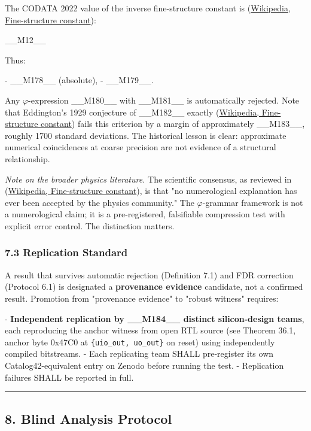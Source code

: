 The CODATA 2022 value of the inverse fine-structure constant is (\href{https://en.wikipedia.org/wiki/Fine-structure\_constant}{Wikipedia, Fine-structure constant}):

\_\_M12\_\_

Thus:

- \_\_M178\_\_ (absolute),
- \_\_M179\_\_.

Any $\varphi$-expression \_\_M180\_\_ with \_\_M181\_\_ is automatically rejected. Note that Eddington's 1929 conjecture of \_\_M182\_\_ exactly (\href{https://en.wikipedia.org/wiki/Fine-structure\_constant}{Wikipedia, Fine-structure constant}) fails this criterion by a margin of approximately \_\_M183\_\_, roughly 1700 standard deviations. The historical lesson is clear: approximate numerical coincidences at coarse precision are not evidence of a structural relationship.

\textit{Note on the broader physics literature.} The scientific consensus, as reviewed in (\href{https://en.wikipedia.org/wiki/Fine-structure\_constant}{Wikipedia, Fine-structure constant}), is that "no numerological explanation has ever been accepted by the physics community." The $\varphi$-grammar framework is not a numerological claim; it is a pre-registered, falsifiable compression test with explicit error control. The distinction matters.

\subsubsection{7.3 Replication Standard}

A result that survives automatic rejection (Definition 7.1) and FDR correction (Protocol 6.1) is designated a \textbf{provenance evidence} candidate, not a confirmed result. Promotion from "provenance evidence" to "robust witness" requires:

- \textbf{Independent replication by \_\_M184\_\_ distinct silicon-design teams}, each reproducing the anchor witness from open RTL source (see Theorem 36.1, anchor byte 0x47C0 at \texttt{\{uio\_out, uo\_out\}} on reset) using independently compiled bitstreams.
- Each replicating team SHALL pre-register its own Catalog42-equivalent entry on Zenodo before running the test.
- Replication failures SHALL be reported in full.

\noindent\rule{\textwidth}{0.4pt}

\subsection{8. Blind Analysis Protocol}

